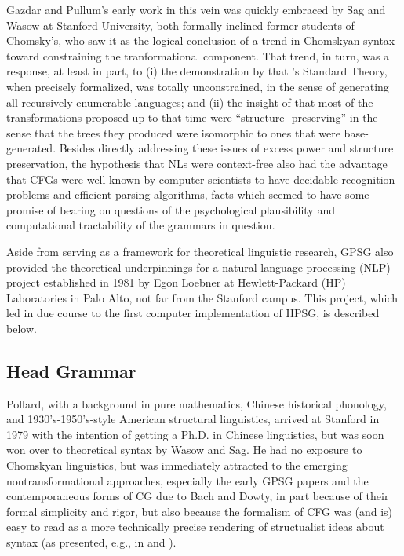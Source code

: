 \documentclass[output=paper]{langsci/langscibook}
\begin{document}
Gazdar and Pullum's early work in this vein was quickly embraced by Sag and Wasow at Stanford University, both formally inclined former students of Chomsky's, who saw it as the logical conclusion of a trend in Chomskyan syntax toward constraining the tranformational component. That trend, in turn, was a response, at least in part, to (i) the demonstration by \citet{PR73a-u} that \citet{Chomsky65a}'s Standard Theory, when precisely formalized, was totally unconstrained, in the sense of generating all recursively enumerable languages; and (ii) the insight of \citet{Emonds76a-u} that most of the transformations proposed up to that time were ``structure- preserving'' in the sense that the trees they produced were isomorphic to ones that were base-generated. Besides directly addressing these issues of excess power and structure preservation, the hypothesis that NLs were context-free also had the advantage that CFGs were well-known by computer scientists to have decidable recognition problems and efficient parsing algorithms, facts which seemed to have some promise of bearing on questions of the psychological plausibility and computational tractability of the grammars in question.

Aside from serving as a framework for theoretical linguistic research, GPSG also provided the theoretical underpinnings for a natural language processing (NLP) project established in 1981 by Egon Loebner at Hewlett-Packard (HP) Laboratories in Palo Alto, not far from the Stanford campus. This project, which led in due course to the first computer implementation of HPSG, is described below.

\subsection{Head Grammar}

Pollard, with a background in pure mathematics, Chinese historical phonology, and 1930's-1950's-style American structural linguistics, arrived at Stanford in 1979 with the intention of getting a Ph.D. in Chinese linguistics, but was soon won over to theoretical syntax by Wasow and Sag. He had no exposure to Chomskyan linguistics, but was immediately attracted to the emerging nontransformational approaches, especially the early GPSG papers and the contemporaneous forms of CG due to Bach and Dowty, in part because of their formal simplicity and rigor, but also because the formalism of CFG was (and is) easy to read as a more technically precise rendering of structualist ideas about syntax (as presented, e.g., in \citet{Bloomfield33-u} and \citet{Hockett1958}).
\end{document}
